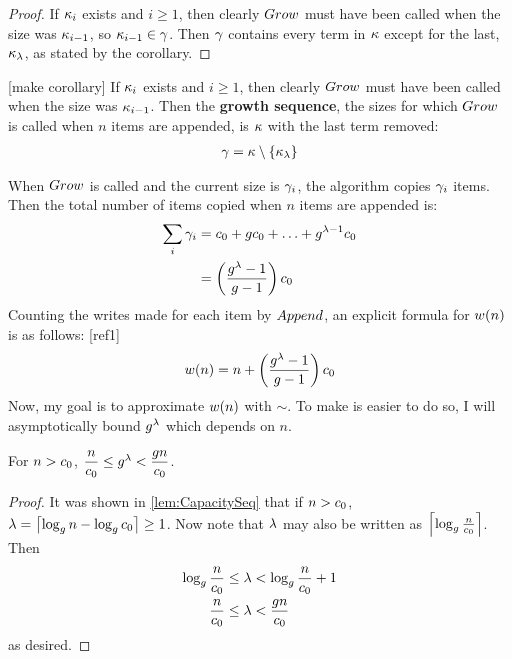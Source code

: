 \begin{proof}
	If $\kappa_i$ exists and $i \geq 1$, then clearly $Grow$ must have been called when the size was $\kappa_{i - 1}$, so $\kappa_{i - 1} \in \gamma$. Then $\gamma$ contains every term in $\kappa$ except for the last, $\kappa_\lambda$, as stated by the corollary.
\end{proof}
[make corollary]
If $\kappa_i$ exists and $i \geq 1$, then clearly $Grow$ must have been called when the size was $\kappa_{i - 1}$. Then the \textbf{growth sequence}, the sizes for which $Grow$ is called when $n$ items are appended, is $\kappa$ with the last term removed:
\begin{align*}
\gamma = \kappa \setminus \left\{ \kappa_\lambda \right\}
\end{align*}

When $Grow$ is called and the current size is $\gamma_i$, the algorithm copies $\gamma_i$ items. Then the total number of items copied when $n$ items are appended is:
\begin{align*}
\sum_i {\gamma_i} &= c_0 + gc_0 + \ldots + g^{\lambda - 1}c_0\\
&= \left( \frac{g^{\lambda} - 1}{g - 1} \right) c_0
\end{align*}
Counting the writes made for each item by $Append$, an explicit formula for $w(n)$ is as follows:
[ref1]
\begin{align*}
w(n) = n + \left( \frac{g^\lambda - 1}{g - 1} \right) c_0
\end{align*}
Now, my goal is to approximate $w(n)$ with $\sim$. To make is easier to do so, I will asymptotically bound $g^\lambda$ which depends on $n$.

\begin{lemma}
\label{lem:ToVarUsefulPowerBounds}
	For $n > c_0$, $\dfrac n {c_0} \leq g^\lambda < \dfrac {g{n}} {c_0}$.
\end{lemma}

\begin{proof}
	It was shown in \ref{lem:CapacitySeq} that if $n > c_0$, $\lambda = \left\lceil \log_{g} n - \log_{g} c_0 \right\rceil \geq 1$.  Now note that $\lambda$ may also be written as $\left\lceil \log_{g} \frac {n} {c_0} \right\rceil$. Then
	\begin{align*}
	\log_{g} \frac {n} {c_0} \leq \lambda &< \log_{g} \frac {n} {c_0} + 1\\
	\frac{n}{c_0} \leq \lambda &< \frac{g{n}}{c_0}
	\end{align*}
	as desired.
\end{proof}

